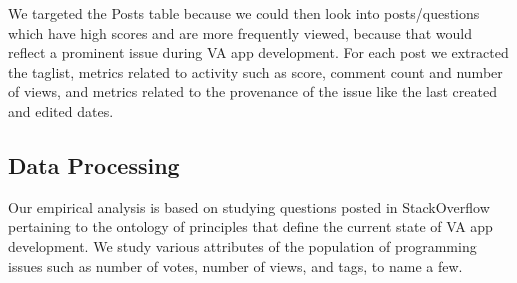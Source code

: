 \documentclass{sigchi}
\begin{document}
\begin{table}[H] \tiny %
\centering
\caption{List of tags used to filter the StackOverflow data}
\label{table:tags}
\end{table}

We targeted the Posts table because we could then look into posts/questions which have high scores and are more frequently viewed, because that would reflect a prominent issue during VA app development. For each post we extracted the taglist, metrics related to activity such as score, comment count and number of views, and metrics related to the provenance of the issue like the last created and edited dates. 

\subsection{Data Processing}
Our empirical analysis is based on studying questions posted in StackOverflow pertaining to the ontology of principles that define the current state of VA app development. We study various attributes of the population of programming issues such as number of votes, number of views, and tags, to name a few. 
\end{document}
